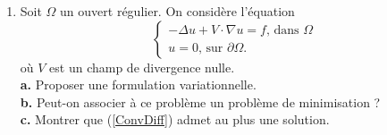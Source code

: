 \documentclass[12pt,a4paper]{article}
\begin{document}
\begin{enumerate}
\item Soit $\Omega$ un ouvert r\'egulier. On consid\`ere l'\'equation 
\begin{equation}\label{ConvDiff}
\begin{cases}
-\Delta u +V\cdot\nabla u = f,\,\text{dans }\Omega\\
u = 0,\,\text{sur }\partial\Omega.
\end{cases}
\end{equation}
o\`u $V$ est un champ de divergence nulle. \\
{\bf a.} Proposer une formulation variationnelle. \\
{\bf b.} Peut-on associer à ce probl\`eme un probl\`eme de
minimisation ? \\
{\bf c.} Montrer que (\ref{ConvDiff}) admet au plus une solution. \\



\end{enumerate}
\end{document}
